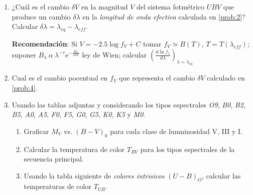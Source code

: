 \documentclass[10pt,spanish,a4paper,1p]{practice}
\begin{document}
\begin{enumerate}[wide, labelwidth=!, labelindent=0pt, label=\textbf{\textrm{\arabic*)}}, ref=\arabic*]

    \item \label{prob:4} ¿Cuál es el cambio $\delta V$ en la magnitud $V$ del sistema fotmétrico $UBV$ que produce un cambio $\delta\lambda$ en la \emph{longitud de onda efectiva} calculada en \ref{prob:2}? Calcular $\delta\lambda = {\lambda}_{eq} - {\lambda}_{eff}$.

    \textbf{Recomendación}:
    Si $V = -2.5 \log f_V + C$ tomar $f_V \simeq B\left(T\right) $, $T=T\left({\lambda}_{eff}\right)$; suponer $B_{\lambda}\ \alpha\ {\lambda}^{-v} \mathrm{e}^{-\frac{hc}{\lambda k T}}$ ley de Wien; calcular $\left(\frac{\mathrm{d} \ln {f}_{\lambda}}{\mathrm{d}\lambda}\right)_{\lambda = {\lambda}_{eq}}$

    \item \label{prob:5} Cual es el cambio pocentual en $f_V$ que representa el cambio $\delta V$ calculado en \ref{prob:4}.

    \item \label{prob:6} Usando las tablas adjuntas y considerando los tipos espectrales \emph{O9},
    \emph{B0}, \emph{B2}, \emph{B5}, \emph{A0}, \emph{A5}, \emph{F0}, \emph{F5}, \emph{G0}, \emph{G5}, \emph{K0}, \emph{K5} y \emph{M0}.

      \begin{enumerate}
        \item Graficar $M_V$ vs. $\left(B-V\right)_{0}$ para cada clase de lumninosidad V, III y I.

        \item \label{prob:6:a} Calcular la temperatura de color $T_{BV}$ para los tipos espectrales de la secuencia principal.

        \item \label{prob:6:b} Usando la tabla siguiente de \emph{colores intrisicos} $\left(U-B\right)_O$, calcular las temperaturas de color $T_{UB}$.


\end{enumerate}
\end{enumerate}
\end{document}
